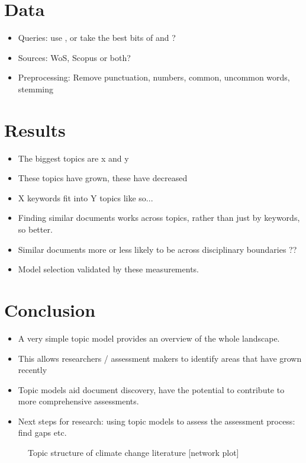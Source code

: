 \documentclass{article}
\begin{document}
\section{Data}
\begin{itemize}
	\item Queries: use \citet{Grieneisen2011}, or take the best bits of \citet{Grieneisen2011} and \citet{Haunschild2016}?
    \item Sources: WoS, Scopus or both?
    \item Preprocessing: Remove punctuation, numbers, common, uncommon words, stemming
\end{itemize}

\section{Results}
\begin{itemize}
	\item The biggest topics are x and y
	\item These topics have grown, these have decreased
    \item X keywords fit into Y topics like so...
    \item Finding similar documents works across topics, rather than just by keywords, so better.
    \item Similar documents more or less likely to be across disciplinary boundaries ??
    \item Model selection validated by these measurements.
\end{itemize}

\section{Conclusion}
\begin{itemize}
	\item A very simple topic model provides an overview of the whole landscape.
    \item This allows researchers / assessment makers to identify areas that have grown recently
    \item Topic models aid document discovery, have the potential to contribute to more comprehensive assessments.
    \item Next steps for research: using topic models to assess the assessment process: find gaps etc.
\end{itemize}

\begin{figure}
    \caption{Topic structure of climate change literature [network plot]}
\end{figure}
\end{document}
